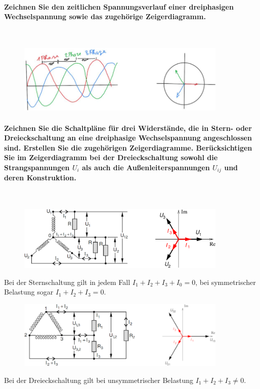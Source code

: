 \documentclass[a4paper, 11pt, ngerman, parskip=half-]{scrartcl}
\begin{document}
\paragraph{Zeichnen Sie den zeitlichen Spannungsverlauf einer dreiphasigen Wechselspannung sowie das
    zugehörige Zeigerdiagramm.} ~

\begin{figure}[H]
    \centering
    \includegraphics[width=10cm]{image/09/4}
\end{figure}

\paragraph{Zeichnen Sie die Schaltpläne für drei Widerstände, die in Stern- oder Dreieckschaltung an
    eine dreiphasige Wechselspannung angeschlossen sind. Erstellen Sie die zugehörigen Zeigerdiagramme.
    Berücksichtigen Sie im Zeigerdiagramm bei der Dreieckschaltung sowohl die Strangspannungen $U_i$ als
    auch die Außenleiterspannungen $U_{ij}$ und deren Konstruktion.} ~

\begin{figure}[H]
    \centering
    \includegraphics[width=10cm]{image/09/5.1}
\end{figure}
Bei der Sternschaltung gilt in jedem Fall $I_1 + I_2 + I_3 + I_0 = 0$, bei symmetrischer Belastung
sogar $I_1 + I_2 + I_3= 0$.
\begin{figure}[H]
    \centering
    \includegraphics[width=10cm]{image/09/5.2}
\end{figure}
Bei der Dreieckschaltung gilt bei unsymmetrischer Belastung $I_1 + I_2 + I_3 \neq 0$.
\end{document}
